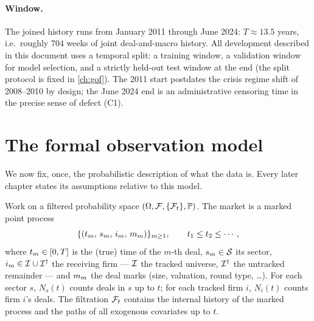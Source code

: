 \paragraph{Window.} The joined history runs from January 2011 through June
2024: $T \approx 13.5$ years, i.e.\ roughly $704$ weeks of joint
deal-and-macro history. All development described in this document uses a
temporal split: a training window, a validation window for model selection,
and a strictly held-out test window at the end (the split protocol is fixed
in \cref{ch:gof}). The 2011 start postdates the crisis regime shift of
2008--2010 by design; the June 2024 end is an administrative censoring
time in the precise sense of defect (C1).

\section{The formal observation model}\label{ch02:sec:formal}

We now fix, once, the probabilistic description of what the data is. Every
later chapter states its assumptions relative to this model.

\begin{definition}\label{def:ch02:market}
Work on a filtered probability space $(\Omega,\mathcal{F},\{\mathcal{F}_{t}\},\mathbb{P})$. The
market is a marked point process
\[
\{(t_m,\, s_m,\, i_m,\, m_m)\}_{m \ge 1},
\qquad
t_1 \le t_2 \le \cdots,
\]
where $t_m \in [0,T]$ is the (true) time of the $m$-th deal, $s_m \in
\mathcal{S}$ its sector, $i_m \in \mathcal{I} \cup \mathcal{I}^{\dagger}$ the receiving
firm --- $\mathcal{I}$ the tracked universe, $\mathcal{I}^{\dagger}$ the untracked
remainder --- and $m_m$ the deal marks (size, valuation, round type,
\dots). For each sector $s$, $N_s(t)$ counts deals in $s$ up to $t$; for
each tracked firm $i$, $N_i(t)$ counts firm $i$'s deals. The filtration
$\mathcal{F}_{t}$ contains the internal history of the marked process and the paths of
all exogenous covariates up to $t$.
\end{definition}

